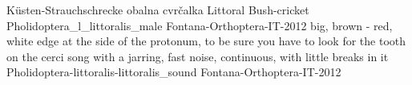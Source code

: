 {Küsten-Strauchschrecke} %
{obalna cvr\v{c}alka} %
{Littoral Bush-cricket} %
{Pholidoptera_l_littoralis_male} {Fontana-Orthoptera-IT-2012} %
{} %
{big, brown - red, white edge at the side of the protonum, to be sure you have to look for the tooth on the cerci} %
{song with a jarring, fast noise, continuous, with little breaks in it} %
{Pholidoptera-littoralis-littoralis_sound} {Fontana-Orthoptera-IT-2012} %
